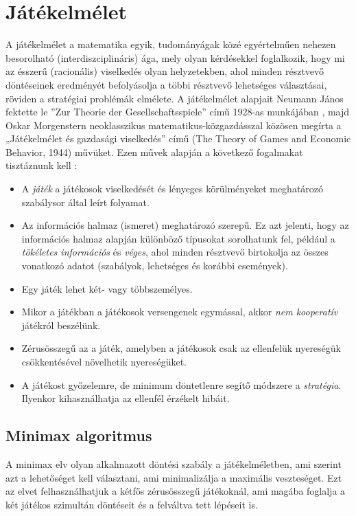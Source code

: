 \documentclass[
]{thesis-ekf}
\theoremstyle{definition}
\theoremstyle{remark}
\begin{document}
\section{Játékelmélet}

A játékelmélet a matematika egyik, tudományágak közé egyértelműen nehezen besorolható (interdiszciplináris) ága, mely olyan kérdésekkel foglalkozik, hogy mi az ésszerű (racionális) viselkedés olyan helyzetekben, ahol minden résztvevő döntéseinek eredményét befolyásolja a többi résztvevő lehetséges választásai, röviden a stratégiai problémák elmélete. A játékelmélet alapjait Neumann János fektette le ''Zur Theorie der Gesellschaftsspiele'' című 1928-as munkájában \cite{Neumann}, majd Oskar Morgenstern neoklasszikus matematikus-közgazdásszal közösen megírta a „Játékelmélet és gazdasági viselkedés” című (The Theory of Games and Economic Behavior, 1944) művüket. \cite{Jatekelmelet,JatekelmeletEn} Ezen művek alapján a következő fogalmakat tisztáznunk kell \cite{NeumannOskar}:

\begin{itemize}
	\item A \emph{játék} a játékosok viselkedését és lényeges körülményeket meghatározó szabálysor által leírt folyamat.
	\item Az információs halmaz (ismeret) meghatározó szerepű. Ez azt jelenti, hogy az információs halmaz alapján különböző típusokat sorolhatunk fel, például a \emph{tökéletes információs} és \emph{véges}, ahol minden résztvevő birtokolja az összes vonatkozó adatot (szabályok, lehetséges és korábbi események).
	\item Egy játék lehet két- vagy többszemélyes.
	\item Mikor a játékban a játékosok versengenek egymással, akkor \emph{nem kooperatív} játékról beszélünk.
	\item Zérusösszegű az a játék, amelyben a játékosok csak az ellenfelük nyereségük csökkentésével növelhetik nyereségüket.
	\item A játékost győzelemre, de minimum döntetlenre segítő módszere a \emph{stratégia}. Ilyenkor kihasználhatja az ellenfél érzékelt hibáit.
\end{itemize} 



\subsection{Minimax algoritmus}

A minimax elv olyan alkalmazott döntési szabály a játékelméletben, ami szerint azt a lehetőséget kell választani, ami minimalizálja a maximális veszteséget. Ezt az elvet felhasználhatjuk a kétfős zérusösszegű játékoknál, ami magába foglalja a két játékos szimultán döntéseit és a felváltva tett lépéseit is. \cite{MiniMaxEnWiki}
\end{document}
